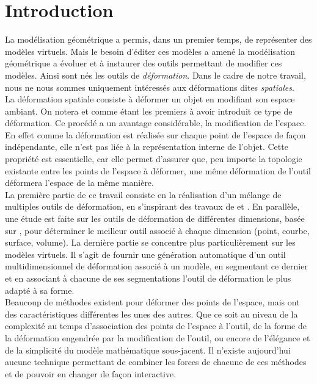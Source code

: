\chapter{Introduction}

\graphicspath{ {Introduction/IntroductionFigs/PNG/}
  {Introduction/IntroductionFigs/PDF/}
  {Introduction/IntroductionFigs/} }

La modélisation géométrique a permis, dans un premier temps, de
représenter des modèles virtuels. Mais le besoin d'éditer ces modèles
a amené la modélisation géométrique a évoluer et à instaurer des
outils permettant de modifier ces modèles. Ainsi sont nés les outils
de \textit{déformation}. Dans le cadre de notre travail, nous ne nous
sommes uniquement intéressés aux déformations dites
\textit{spatiales}.
\\

La déformation spatiale consiste à déformer un objet en modifiant son
espace ambiant.  On notera \cite{Bar84} et \cite{SP86} comme étant les
premiers à avoir introduit ce type de déformation. Ce procédé a un
avantage considérable, la modification de l'espace. En effet comme la
déformation est réalisée sur chaque point de l'espace de façon
indépendante, elle n'est pas liée à la représentation interne de
l'objet. Cette propriété est essentielle, car elle permet d'assurer
que, peu importe la topologie existante entre les points de l'espace à
déformer, une même déformation de l'outil déformera l'espace de la
même manière.
\\

La première partie de ce travail consiste en la réalisation d'un
mélange de multiples outils de déformation, en s'inspirant des travaux
de \cite{JBPS11} et \cite{GPCP13}. En parallèle, une étude est faite
sur les outils de déformation de différentes dimensions, basée sur
\cite{GB08}, pour déterminer le meilleur outil associé à chaque
dimension (point, courbe, surface, volume). La dernière partie se
concentre plus particulièrement sur les modèles virtuels. Il s'agit de
fournir une génération automatique d'un outil multidimensionnel de
déformation associé à un modèle, en segmentant ce dernier et en
associant à chacune de ses segmentations l'outil de déformation le
plus adapté à sa forme.
\\

Beaucoup de méthodes existent pour déformer des points de l'espace,
mais ont des caractéristiques différentes les unes des autres. Que ce
soit au niveau de la complexité au temps d'association des points de
l'espace à l'outil, de la forme de la déformation engendrée par la
modification de l'outil, ou encore de l'élégance et de la simplicité
du modèle mathématique sous-jacent. Il n'existe aujourd'hui aucune
technique permettant de combiner les forces de chacune de ces méthodes
et de pouvoir en changer de façon interactive.
\\

